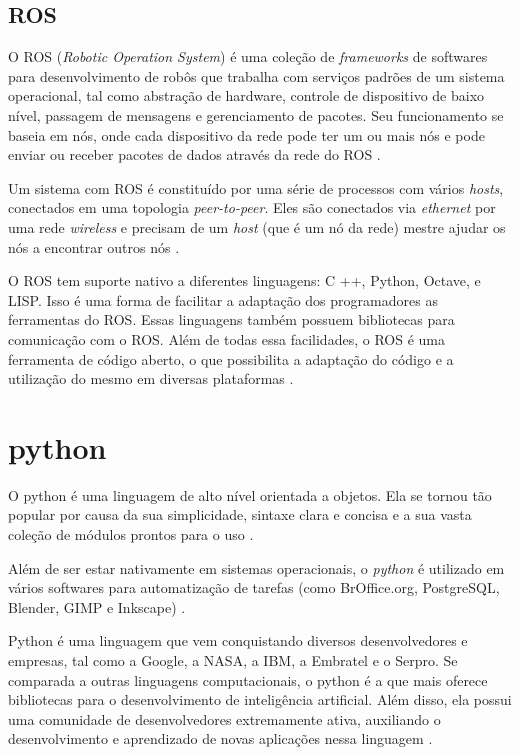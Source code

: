 \subsection{ROS}

O ROS (\textit{Robotic Operation System}) é uma coleção de \textit{frameworks} de softwares para desenvolvimento de robôs que trabalha com serviços padrões de um sistema operacional, tal como abstração de hardware, controle de dispositivo de baixo nível, passagem de mensagens e gerenciamento de pacotes. Seu funcionamento se baseia em nós, onde cada dispositivo da rede pode ter um ou mais nós e pode enviar ou receber pacotes de dados através da rede do ROS  \cite{ros}.

Um sistema com ROS é constituído por uma série de processos com vários \textit{hosts}, conectados em uma topologia \textit{peer-to-peer}. Eles são conectados via \textit{ethernet} por uma rede \textit{wireless} e precisam de um \textit{host} (que é um nó da rede) mestre ajudar os nós a encontrar outros nós \cite{Ros2}.

O ROS tem suporte nativo a diferentes linguagens:  C ++, Python, Octave, e LISP. Isso é uma forma de facilitar a adaptação dos programadores as ferramentas do ROS. Essas linguagens também possuem bibliotecas para comunicação com o ROS. Além de todas essa facilidades, o ROS é uma ferramenta de código aberto, o que possibilita a adaptação do código e a utilização do mesmo em diversas plataformas \cite{Ros2}.

\section{python}
\label{sec:python}

O python é uma linguagem de alto nível orientada a objetos. Ela se tornou tão popular por causa da sua simplicidade, sintaxe clara e concisa e a sua vasta coleção de módulos prontos para o uso \cite{borges2014python}. 

Além de ser estar nativamente em sistemas operacionais, o \textit{python} é utilizado em vários softwares para automatização de tarefas (como BrOffice.org, PostgreSQL, Blender, GIMP e Inkscape) \cite{borges2014python}. 

Python é uma linguagem que vem conquistando diversos desenvolvedores e empresas, tal como a Google, a NASA, a IBM, a Embratel e o Serpro. Se comparada a outras linguagens computacionais, o python é a que mais oferece bibliotecas para o desenvolvimento de inteligência artificial. Além disso, ela possui uma comunidade de desenvolvedores extremamente ativa, auxiliando o desenvolvimento e aprendizado de novas aplicações nessa linguagem \cite{jonasgranatyr}. 

